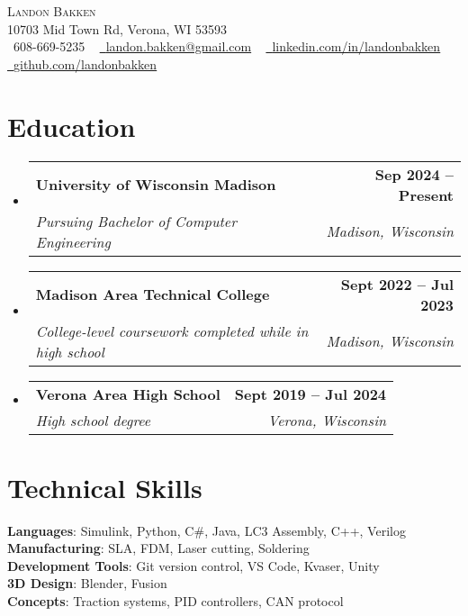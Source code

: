 \documentclass[letterpaper,11pt]{article}
\makeatletter
\newcommand{\resumeSubheading}[4]{
  \vspace{-2pt}\item
    \begin{tabular*}{1.0\textwidth}[t]{l@{\extracolsep{\fill}}r}
      \textbf{#1} & \textbf{\small #2} \\
      \textit{\small#3} & \textit{\small #4} \\
    \end{tabular*}\vspace{-7pt}
}
\newcommand{\resumeSubHeadingListStart}{\begin{itemize}[leftmargin=0.0in, label={}]}
\newcommand{\resumeSubHeadingListEnd}{\end{itemize}}
\makeatother
\begin{document}

\begin{center}
    {\Huge \scshape Landon Bakken} \\ \vspace{1pt}
    10703 Mid Town Rd, Verona, WI 53593 \\ \vspace{1pt}
    \small \raisebox{-0.1\height}\faPhone\ 608-669-5235 ~ \href{mailto:x@gmail.com}{\raisebox{-0.2\height}\faEnvelope\  \underline{landon.bakken@gmail.com}} ~ 
    \href{https://linkedin.com/in//}{\raisebox{-0.2\height}\faLinkedin\ \underline{linkedin.com/in/landonbakken}}  ~
    \href{https://github.com/}{\raisebox{-0.2\height}\faGithub\ \underline{github.com/landonbakken}}
    \vspace{-8pt}
\end{center}


\section{Education}
  \resumeSubHeadingListStart
    \resumeSubheading
      {University of Wisconsin Madison}{Sep 2024 -- Present}
      {Pursuing Bachelor of Computer Engineering}{Madison, Wisconsin}
    \resumeSubheading
      {Madison Area Technical College}{Sept 2022 -- Jul 2023}
      {College-level coursework completed while in high school}{Madison, Wisconsin}
    \resumeSubheading
      {Verona Area High School}{Sept 2019 -- Jul 2024}
      {High school degree}{Verona, Wisconsin}
  \resumeSubHeadingListEnd
\vspace{-5pt}


\section{Technical Skills}
 \begin{itemize}[leftmargin=0.15in, label={}]
    \small{\item{
     \textbf{Languages}{: Simulink, Python, C\#, Java, LC3 Assembly, C++, Verilog} \\
     \textbf{Manufacturing}{: SLA, FDM, Laser cutting, Soldering} \\
     \textbf{Development Tools}{: Git version control, VS Code, Kvaser, Unity} \\
     \textbf{3D Design}{: Blender, Fusion} \\
     \textbf{Concepts}{: Traction systems, PID controllers, CAN protocol} }}
 \end{itemize}
 \vspace{-15pt}
\end{document}
